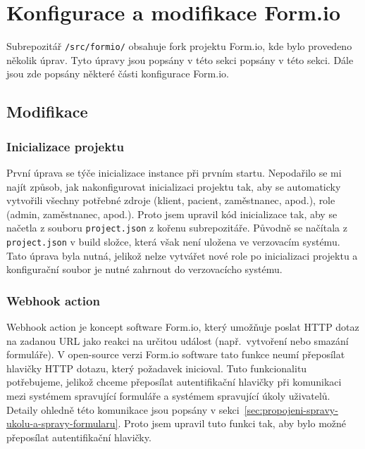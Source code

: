 \section{Konfigurace a modifikace Form.io}\label{sec:konfigurace-a-modifikace-form.io}

Subrepozitář \texttt{/src/formio/} obsahuje fork projektu Form.io, kde bylo provedeno několik úprav.
Tyto úpravy jsou popsány v této sekci popsány v této sekci.
Dále jsou zde popsány některé části konfigurace Form.io.

\subsection{Modifikace}\label{subsec:modifikace}

\subsubsection{Inicializace projektu}\label{subsubsec:inicializace-projektu}

První úprava se týče inicializace instance při prvním startu.
Nepodařilo se mi najít způsob, jak nakonfigurovat inicializaci projektu tak, aby se automaticky vytvořili všechny potřebné zdroje (klient, pacient, zaměstnanec, apod.), role (admin, zaměstnanec, apod.).
Proto jsem upravil kód inicializace tak, aby se načetla z souboru \texttt{project.json} z kořenu subrepozitáře.
Původně se načítala z \texttt{project.json} v build složce, která však není uložena ve verzovacím systému.
Tato úprava byla nutná, jelikož nelze vytvářet nové role po inicializaci projektu a konfigurační soubor je nutné zahrnout do verzovacícho systému.

\subsubsection{Webhook action}\label{subsubsec:webhook-action}

Webhook action je koncept software Form.io, který umožňuje poslat HTTP dotaz na zadanou URL jako reakci na určitou událost (např.\ vytvoření nebo smazání formuláře).
V open-source verzi Form.io software tato funkce neumí přeposílat hlavičky HTTP dotazu, který požadavek inicioval.
Tuto funkcionalitu potřebujeme, jelikož chceme přeposílat autentifikační hlavičky při komunikaci mezi systémem spravující formuláře a systémem spravující úkoly uživatelů.
Detaily ohledně této komunikace jsou popsány v sekci\ \ref{sec:propojeni-spravy-ukolu-a-spravy-formularu}.
Proto jsem upravil tuto funkci tak, aby bylo možné přeposílat autentifikační hlavičky.

